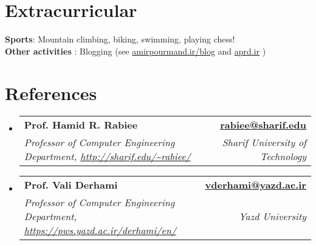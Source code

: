 \documentclass[letterpaper,11pt]{article}
\makeatletter
\newcommand{\resumeSubheading}[4]{
  \vspace{-2pt}\item
    \begin{tabular*}{1.0\textwidth}[t]{l@{\extracolsep{\fill}}r}
      \textbf{#1} & \textbf{\small #2} \\
    \textcolor{sgray} {\textit{\small#3}} & \textcolor{sgray}{ \textit{\small #4} }\\
    \end{tabular*}\vspace{-7pt}
}
\newcommand{\resumeSubHeadingListStart}{\begin{itemize}[leftmargin=0.0in, label={}]}
\newcommand{\resumeSubHeadingListEnd}{\end{itemize}}
\makeatother
\begin{document}

\section{Extracurricular}
 \begin{itemize}[leftmargin=0.15in, 
	label={}
	]
	\small{\item{
			\textbf{Sports}{: Mountain climbing, biking, swimming, playing chess!} \\
			\textbf{Other activities}
			{: Blogging (see 
				\href{https://amirpourmand.ir/blog}
				{amirpourmand.ir/blog} and 
				\href{https://aprd.ir}{aprd.ir}}
				)}\\
	}
\end{itemize}
\section{References}
\label{references}
\resumeSubHeadingListStart
    \resumeSubheading
      {Prof. Hamid R. Rabiee}{\href{mailto:rabiee@sharif.edu}{rabiee@sharif.edu} }{Professor of Computer Engineering Department,
\url{http://sharif.edu/~rabiee/}}{Sharif University of Technology}
 \resumeSubHeadingListEnd

\resumeSubHeadingListStart
    \resumeSubheading
      {Prof. Vali Derhami}
      {\href{mailto:vderhami@yazd.ac.ir}{vderhami@yazd.ac.ir}}
      {Professor of Computer Engineering Department,
\url{https://pws.yazd.ac.ir/derhami/en/}}{Yazd University}
 \resumeSubHeadingListEnd
 
 
\end{document}
